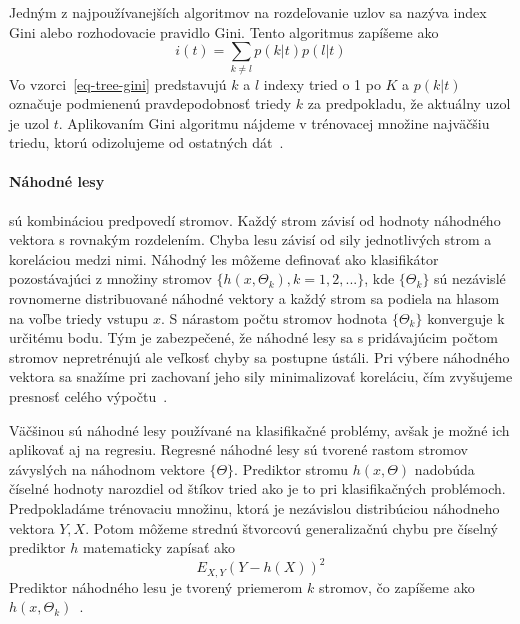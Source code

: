 \documentclass[a4paper,slovak,12pt,appendix]{article}
\begin{document}
Jedným z najpoužívanejších algoritmov na rozdeľovanie uzlov sa nazýva index
Gini alebo rozhodovacie pravidlo Gini. Tento algoritmus zapíšeme ako
\begin{equation}
  i(t) = \sum_{k \neq l} p(k|t) p(l|t)
  \label{eq-tree-gini}
\end{equation}
Vo vzorci~\ref{eq-tree-gini} predstavujú $k$ a $l$ indexy tried o 1 po $K$ a
$p(k|t)$ označuje podmienenú pravdepodobnosť triedy $k$ za predpokladu, že
aktuálny uzol je uzol $t$. Aplikovaním Gini algoritmu nájdeme v trénovacej
množine najväčšiu triedu, ktorú odizolujeme od ostatných dát~\cite{Bel2009}.


\paragraph{Náhodné lesy} sú kombináciou predpovedí stromov. Každý strom závisí
od hodnoty náhodného vektora s rovnakým rozdelením. Chyba lesu závisí od sily
jednotlivých strom a koreláciou medzi nimi. Náhodný les môžeme definovať ako
klasifikátor pozostávajúci z množiny stromov $\{h(x, \Theta_k), k=1, 2, ... \}$,
kde $\{\Theta_k\}$ sú nezávislé rovnomerne distribuované náhodné vektory a každý
strom sa podiela na hlasom na voľbe triedy vstupu $x$. S nárastom počtu stromov
hodnota $\{\Theta_k\}$ konverguje k určitému bodu. Tým je zabezpečené, že
náhodné lesy sa s pridávajúcim počtom stromov nepretrénujú ale veľkosť chyby sa
postupne ústáli. Pri výbere náhodného vektora sa snažíme pri zachovaní jeho
sily minimalizovať koreláciu, čím zvyšujeme presnosť celého
výpočtu~\cite{Breiman2001}.

Väčšinou sú náhodné lesy používané na klasifikačné problémy, avšak je možné ich
aplikovať aj na regresiu. Regresné náhodné lesy sú tvorené rastom stromov
závyslých na náhodnom vektore $\{\Theta\}$. Prediktor stromu $h(x, \Theta)$
nadobúda číselné hodnoty narozdiel od štíkov tried ako je to pri klasifikačných
problémoch. Predpokladáme trénovaciu množinu, ktorá je nezávislou distribúciou
náhodneho vektora $Y, X$. Potom môžeme strednú štvorcovú generalizačnú chybu
pre číselný prediktor $h$ matematicky zapísať ako
\begin{equation}
  E_{X, Y} (Y - h(X))^2
  \label{eq-random-error}
\end{equation}
Prediktor náhodného lesu je tvorený priemerom $k$ stromov, čo zapíšeme ako
$h(x, \Theta_k)$~\cite{Breiman2001}.
\end{document}
